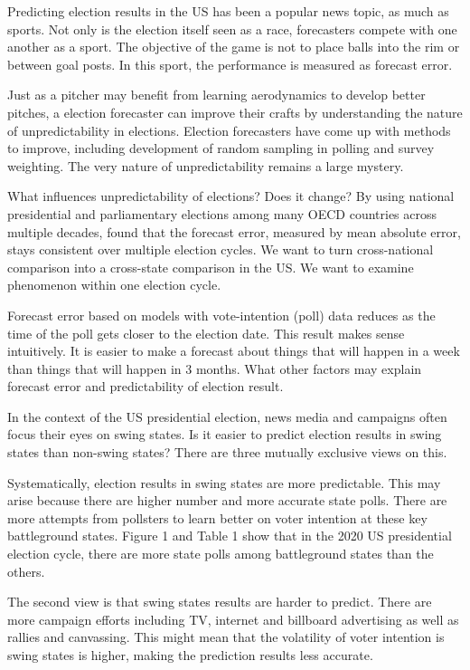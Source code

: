 Predicting election results in the US has been a popular news topic, as much as sports. Not only is the election itself seen as a race, forecasters compete with one another as a sport. The objective of the game is not to place balls into the rim or between goal posts. In this sport, the performance is measured as forecast error. 

Just as a pitcher may benefit from learning aerodynamics to develop better pitches, a election forecaster can improve their crafts by understanding the nature of unpredictability in elections. Election forecasters have come up with methods to improve, including development of random sampling in polling and survey weighting. The very nature of unpredictability remains a large mystery.

What influences unpredictability of elections? Does it change? By using national presidential and parliamentary elections among many OECD countries across multiple decades, \cite{nadeau_2019} found that the forecast error, measured by mean absolute error, stays consistent over multiple election cycles. We want to turn cross-national comparison into a cross-state comparison in the US. We want to examine phenomenon within one election cycle.

Forecast error based on models with vote-intention (poll) data reduces as the time of the poll gets closer to the election date. This result makes sense intuitively. It is easier to make a forecast about things that will happen in a week than things that will happen in 3 months. What other factors may explain forecast error and predictability of election result. 

In the context of the US presidential election, news media and campaigns often focus their eyes on swing states. Is it easier to predict election results in swing states than non-swing states? There are three mutually exclusive views on this. 

Systematically, election results in swing states are more predictable. This may arise because there are higher number and more accurate state polls. There are more attempts from pollsters to learn better on voter intention at these key battleground states. Figure 1 and Table 1 show that in the 2020 US presidential election cycle, there are more state polls among battleground states than the others.

The second view is that swing states results are harder to predict. There are more campaign efforts including TV, internet and billboard advertising as well as rallies and canvassing. This might mean that the volatility of voter intention is swing states is higher, making the prediction results less accurate.  

